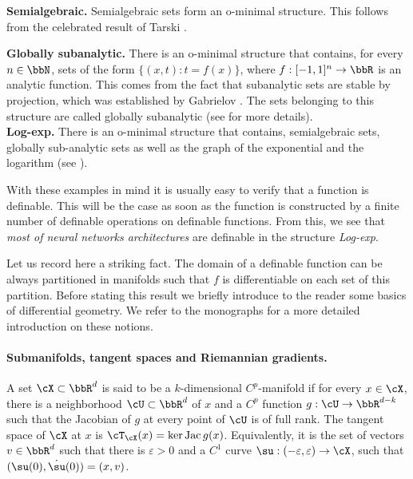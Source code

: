 \textbf{Semialgebraic.} Semialgebraic sets form an o-minimal structure. This follows from the celebrated result of Tarski \cite{tarski1951decision}.

\textbf{Globally subanalytic.} There is an o-minimal structure that contains, for every $n \in \bbN$, sets of the form $\{ (x,t) : t = f(x)\}$, where $f : [-1, 1]^n \rightarrow \bbR$ is an analytic function. This comes from the fact that subanalytic sets are stable by projection, which was established by Gabrielov \cite{gabrielov1968projections, gabrielov1996complements}. The sets belonging to this structure are called globally subanalytic (see \cite{bier_semi_sub} for more details).\\
\textbf{Log-exp.} There is an o-minimal structure that contains, semialgebraic sets, globally sub-analytic sets as well as the graph of the exponential
and the logarithm (see \cite{wilkie1996model, van1994elementary}).


With these examples in mind it is usually easy to verify that a function is definable. This will be the case as soon as the function is constructed by a finite number of definable operations on definable functions. From this, we see that \emph{most of neural networks architectures} are definable in the structure \emph{Log-exp}.

Let us record here a striking fact. The domain of a definable function can be always partitioned in manifolds such that $f$ is differentiable on each set of this partition. Before stating this result we briefly introduce to the reader some basics of differential geometry. We refer to the monographs \cite{Lafontaine_2015,boumal2023intromanifolds} for a more detailed introduction on these notions.

\paragraph{Submanifolds, tangent spaces and Riemannian gradients.}


A set $\cX \subset \bbR^d$ is said to be a $k$-dimensional $C^p$-manifold if for every $x \in \cX$, there is a neighborhood $\cU \subset \bbR^d$ of $x$ and a $C^p$ function $g: \cU \rightarrow \bbR^{d-k}$ such that the Jacobian of $g$ at every point of $\cU$ is of full rank. The tangent space of $\cX$ at $x$ is $\cT_{\cX}(x) =\ker \Jac g(x)$. Equivalently, it is the set of vectors $v \in \bbR^d$ such that there is $\varepsilon >0$ and a $C^1$ curve $\su : (- \varepsilon, \varepsilon) \rightarrow \cX$, such that $(\su(0), \dot{\su}(0)) = (x,v)$.

